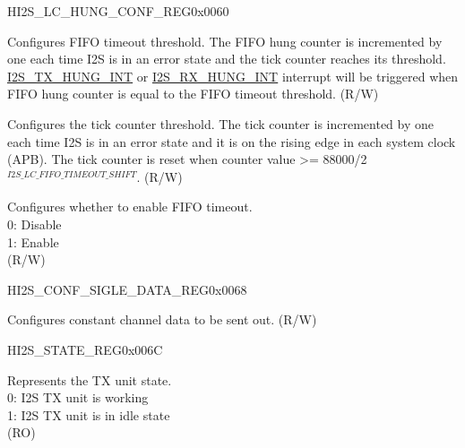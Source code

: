\begin{register}{H}{I2S\_LC\_HUNG\_CONF\_REG}{0x0060}\label{regdesc:I2SLCHUNGCONFREG}
%
%
%
%
\regnewline%
\begin{regdesc}\begin{reglist}
\label{fielddesc:I2SLCFIFOTIMEOUT}\item [I2S\_LC\_FIFO\_TIMEOUT] Configures FIFO timeout threshold. The FIFO hung counter is incremented by one each time I2S is in an error state and the tick counter reaches its threshold. \hyperref[int:I2STXHUNGINT]{I2S\_TX\_HUNG\_INT} or \hyperref[int:I2STXHUNGINT]{I2S\_RX\_HUNG\_INT} interrupt will be triggered when FIFO hung counter is equal to the FIFO timeout threshold. (R/W)
\label{fielddesc:I2SLCFIFOTIMEOUTSHIFT}\item [I2S\_LC\_FIFO\_TIMEOUT\_SHIFT] Configures the tick counter threshold. The tick counter is incremented by one each time I2S is in an error state and it is on the rising edge in each system clock (APB). The tick counter is reset when counter value >= 88000/2$^{I2S\_LC\_FIFO\_TIMEOUT\_SHIFT}$. (R/W)
\label{fielddesc:I2SLCFIFOTIMEOUTENA}\item [I2S\_LC\_FIFO\_TIMEOUT\_ENA] Configures whether to enable FIFO timeout. \\
0: Disable\\
1: Enable\\
(R/W)
\end{reglist}\end{regdesc}
\end{register}


\begin{register}{H}{I2S\_CONF\_SIGLE\_DATA\_REG}{0x0068}\label{regdesc:I2SCONFSIGLEDATAREG}
%
\regnewline%
\begin{regdesc}\begin{reglist}
\label{fielddesc:I2SSINGLEDATA}\item [I2S\_SINGLE\_DATA] Configures constant channel data to be sent out. (R/W)
\end{reglist}\end{regdesc}
\end{register}


\begin{register}{H}{I2S\_STATE\_REG}{0x006C}\label{regdesc:I2SSTATEREG}
%
%
\regnewline%
\begin{regdesc}\begin{reglist}
\label{fielddesc:I2STXIDLE}\item [I2S\_TX\_IDLE] Represents the TX unit state. \\
0: I2S TX unit is working\\
1: I2S TX unit is in idle state\\
(RO)
\end{reglist}\end{regdesc}
\end{register}


